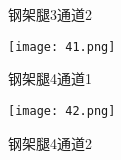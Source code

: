 \documentclass[withoutpreface,bwprint]{cumcmthesis}  %
\begin{document}
\begin{appendices}
\begin{figure}[h!]
\begin{minipage}{.48\textwidth}
                \caption{钢架腿3通道2}  
            \end{minipage}  
        \end{figure}
        \begin{figure}[h!] 
            \begin{minipage}{.48\textwidth} %
                \centering  
                \texttt{[image: 41.png]}  
                \caption{钢架腿4通道1}  
            \end{minipage}  
            \hfill %
            \begin{minipage}{.48\textwidth} %
                \centering  
                \texttt{[image: 42.png]}  
                \caption{钢架腿4通道2}  
                \label{data_end}
            \end{minipage}  
        \end{figure}


\end{appendices}
\end{document}
